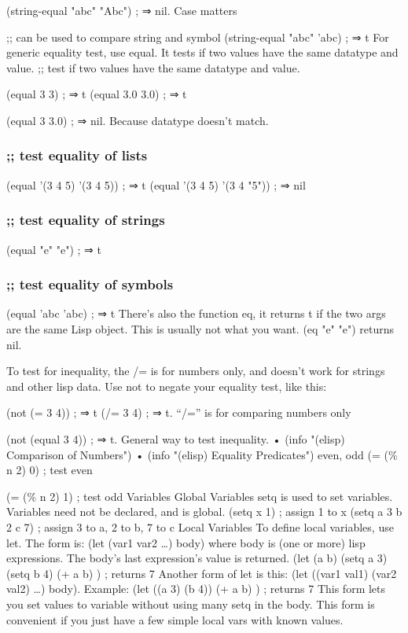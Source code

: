 \documentclass[11pt]{ctexart}
\begin{document}
{{{{(string-equal "abc" "Abc") ; ⇒ nil. Case matters

;; can be used to compare string and symbol
(string-equal "abc" 'abc) ; ⇒ t
For generic equality test, use equal. It tests if two values have the same datatype and value.
;; test if two values have the same datatype and value.

(equal 3 3) ; ⇒ t
(equal 3.0 3.0) ; ⇒ t

(equal 3 3.0) ; ⇒ nil. Because datatype doesn't match.

\subsubsection{;; test equality of lists}
\label{sec:org8535f41}
(equal '(3 4 5) '(3 4 5))  ; ⇒ t
(equal '(3 4 5) '(3 4 "5")) ; ⇒ nil

\subsubsection{;; test equality of strings}
\label{sec:org3614bb8}
(equal "e" "e") ; ⇒ t

\subsubsection{;; test equality of symbols}
\label{sec:orgad6188e}
(equal 'abc 'abc) ; ⇒ t
There's also the function eq, it returns t if the two args are the same Lisp
object. This is usually not what you want. (eq "e" "e") returns nil.

To test for inequality, the /= is for numbers only, and doesn't work for strings
and other lisp data. Use not to negate your equality test, like this:

(not (= 3 4)) ; ⇒ t
(/= 3 4) ; ⇒ t. “/=” is for comparing numbers only

(not (equal 3 4)) ; ⇒ t. General way to test inequality.
•	(info "(elisp) Comparison of Numbers")
•	(info "(elisp) Equality Predicates")
even, odd
(= (\% n 2) 0) ; test even

(= (\% n 2) 1) ; test odd
Variables
Global Variables
setq is used to set variables. Variables need not be declared, and is global.
(setq x 1) ; assign 1 to x
(setq a 3 b 2 c 7) ; assign 3 to a, 2 to b, 7 to c
Local Variables
To define local variables, use let. The form is: (let (var1 var2 …) body) where body is (one or more) lisp expressions. The body's last expression's value is returned.
(let (a b)
(setq a 3)
(setq b 4)
(+ a b)
) ; returns 7
Another form of let is this: (let ((var1 val1) (var2 val2) …) body). Example:
(let ((a 3) (b 4))
(+ a b)
) ; returns 7
This form lets you set values to variable without using many setq in the body. This form is convenient if you just have a few simple local vars with known values.
}}}}
\end{document}
